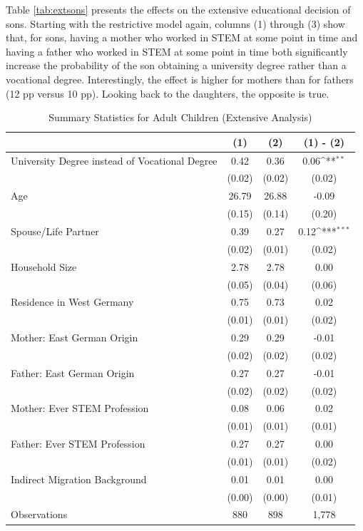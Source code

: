 \documentclass[a4paper, oneside, hyperfootnotes = false]{article}
\def\sym#1{\ifmmode^{#1}\else\(^{#1}\)\fi}
\begin{document}
{Table \ref{tab:extsons} presents the effects on the extensive educational decision of sons.
Starting with the restrictive model again, columns (1) through (3) show that, for sons, having a mother who worked in STEM at some point in time and having a father who worked in STEM at some point in time both significantly increase the probability of the son obtaining a university degree rather than a vocational degree.
Interestingly, the effect is higher for mothers than for fathers (12 pp versus 10 pp).
Looking back to the daughters, the opposite is true.

\begin{table}[ht]
	\caption{Summary Statistics for Adult Children (Extensive Analysis)}
	\label{tab:descr_summary_epid_ext}
	\begin{center}
		\begin{tabular}{l*{3}{c}}
			\toprule
			& (1) & (2) & (1) - (2) \\
			\midrule
			University Degree instead of Vocational Degree & 0.42  & 0.36 & 0.06\sym{**}    \\
			&   (0.02)  & (0.02) & (0.02) \\
			\addlinespace
			Age         &   26.79   &  26.88   &  -0.09    \\
			&     (0.15) &        (0.14)         &      (0.20) \\
			\addlinespace
			Spouse/Life Partner &   0.39    &  0.27 &   0.12\sym{***}    \\
			&      (0.02)&          (0.01)&         (0.02) \\
			\addlinespace
			Household Size      &  2.78   & 2.78    &   0.00        \\
			&          (0.05)&       (0.04)   &   (0.06) \\
			\addlinespace
			Residence in West Germany  &  0.75   &  0.73   &  0.02    \\
			&         (0.01) &       (0.01)&  (0.02)\\
			\addlinespace
			Mother: East German Origin &  0.29   & 0.29    &  -0.01       \\
			&         (0.02) &   (0.02)&  (0.02)\\
			\addlinespace
			Father: East German Origin &  0.27   &   0.27  &    -0.01     \\
			&         (0.02) &       (0.02)&  (0.02)\\
			\addlinespace
			Mother: Ever STEM Profession & 0.08   &  0.06   &  0.02   \\
			&         (0.01) &       (0.01) &  (0.01) \\
			\addlinespace
			Father: Ever STEM Profession &   0.27  &  0.27   &  0.00   \\
			&         (0.01) &       (0.01)&  (0.02)\\
			\addlinespace
			Indirect Migration Background &  0.01   & 0.01    &  0.00    \\
			&         (0.00) &       (0.00)&  (0.01) \\
			\midrule
			Observations        &  880     &  898     &        1,778            \\
			\bottomrule
		\end{tabular}
		

\end{center}
\end{table}}
\end{document}
